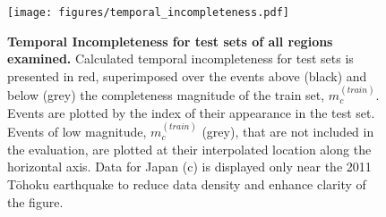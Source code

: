 \documentclass[pdflatex]{sn-jnl}
\begin{document}
\newpage
\begin{figure}[h!]
    \centering
        \texttt{[image: figures/temporal\_incompleteness.pdf]}
    \caption{
    \textbf{Temporal Incompleteness for test sets of all regions examined.} Calculated temporal incompleteness for test sets is presented in red, superimposed over the events above (black) and below (grey) the completeness magnitude of the train set, $m_c^{(train)}$. Events are plotted by the index of their appearance in the test set. Events of low magnitude, $m_c^{(train)}$ (grey), that are not included in the evaluation, are plotted at their interpolated location along the horizontal axis. Data for Japan (c) is displayed only near the 2011 Tōhoku earthquake to reduce data density and enhance clarity of the figure.
    }
    \label{fig:temp_incompleteness}
\end{figure}
\end{document}
